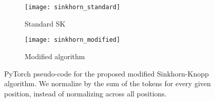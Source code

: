 \begin{figure}
  \centering
    \hfill
    \begin{subfigure}{0.49\linewidth}
    \centering
      \texttt{[image: sinkhorn\_standard]}
      \caption{Standard SK}
      \label{fig:sinkhorn:standard}
    \end{subfigure}
    \hfill
    \begin{subfigure}{0.49\linewidth}
      \centering
      \texttt{[image: sinkhorn\_modified]}
      \caption{Modified algorithm}
      \label{fig:sinkhorn:modified}
    \end{subfigure}
    \hfill
    \caption{
      PyTorch pseudo-code for the proposed modified Sinkhorn-Knopp algorithm.
      We normalize by the sum of the tokens for every given position, instead of normalizing across all positions.
    }
    \label{fig:sinkhorn}
\end{figure}

